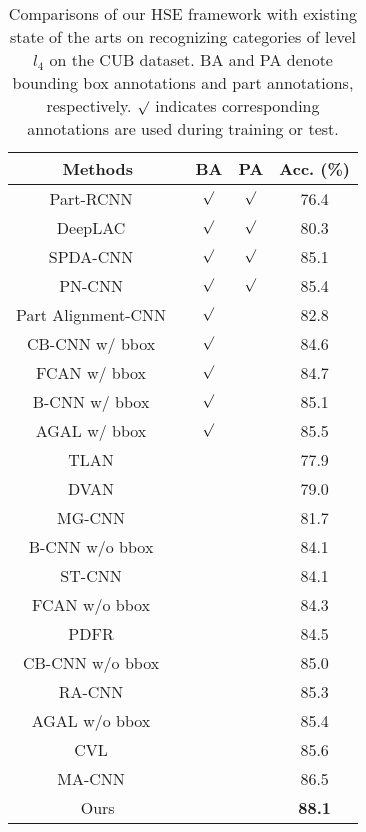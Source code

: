 \documentclass[sigconf]{acmart}
\begin{document}
\begin{table}[!t]
\centering
\begin{tabular}{c|c|c|c}
\hline
\centering  Methods  & BA & PA  & Acc. (\%)  \\
\hline
\hline
Part-RCNN ~\cite{zhang2014part} & $\surd$ & $\surd$ & 76.4 \\
DeepLAC ~\cite{lin2015deep} & $\surd$ & $\surd$ & 80.3 \\
SPDA-CNN ~\cite{zhang2016spda} & $\surd$ & $\surd$ & 85.1 \\
PN-CNN ~\cite{branson2014bird} & $\surd$ & $\surd$ & 85.4 \\
Part Alignment-CNN ~\cite{krause2015fine} & $\surd$ & & 82.8 \\
CB-CNN w/ bbox ~\cite{gao2016compact} & $\surd$ && 84.6 \\
FCAN w/ bbox ~\cite{liu2016fully} & $\surd$ &  & 84.7 \\
B-CNN w/ bbox ~\cite{lin2015bilinear} & $\surd$ & & 85.1 \\
AGAL w/ bbox ~\cite{liu2017localizing} & $\surd$ & & 85.5 \\
\hline
\hline
TLAN ~\cite{xiao2015application} & & & 77.9 \\
DVAN ~\cite{zhao2017diversified} & & & 79.0 \\
MG-CNN ~\cite{wang2015multiple} & & &81.7 \\
B-CNN w/o bbox ~\cite{lin2015bilinear} & & & 84.1 \\
ST-CNN ~\cite{jaderberg2015spatial} & & & 84.1 \\
FCAN w/o bbox ~\cite{liu2016fully} & &  & 84.3 \\
PDFR ~\cite{zhang2016picking} & & & 84.5 \\
CB-CNN w/o bbox ~\cite{gao2016compact} &&& 85.0 \\
RA-CNN ~\cite{fu2017look} & &  & 85.3 \\
AGAL w/o bbox ~\cite{liu2017localizing} & &  & 85.4 \\
CVL ~\cite{he2017fine} & & & 85.6 \\
MA-CNN ~\cite{zheng2017learning} & & & 86.5\\
\hline
\hline
Ours & & & \textbf{88.1} \\ 
\hline
\end{tabular}
\caption{Comparisons of our HSE framework with existing state of the arts on recognizing categories of level $l_4$ on the CUB dataset. BA and PA denote bounding box annotations and part annotations, respectively. $\surd$ indicates corresponding annotations are used during training or test. }
\label{table:cub-sota}
\end{table}
\end{document}
